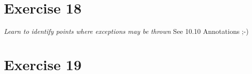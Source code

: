 \documentclass[12pt]{article}
\newcommand{\desc}[1]{\textit{#1} \vspace{1em}}
\begin{document}




\clearpage
\section*{Exercise 18}
\desc{Learn to identify points where exceptions may be thrown}
See 10.10 Annotations ;-)

\clearpage
\section*{Exercise 19}
\desc{}


\clearpage
\end{document}
